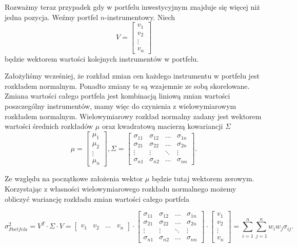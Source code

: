 \documentclass[12pt,titlepage]{article}
\numberwithin{equation}{section}
\begin{document}
Rozważmy teraz przypadek gdy w portfelu inwestycyjnym znajduje się więcej niż jedna pozycja. Weźmy portfel $n$-instrumentowy. Niech
$$V=\begin{bmatrix}
 v_1 \\ 
 v_2 \\
\vdots \\
v_n
\end{bmatrix}$$
będzie wektorem wartości kolejnych instrumentów w portfelu.

Założyliśmy wcześniej, że rozkład zmian cen każdego instrumentu w portfelu jest rozkładem normalnym. Ponadto zmiany te są wzajemnie ze sobą skorelowane. Zmiana wartości całego portfela jest kombinacją liniową zmian wartości poszczególny instrumentów, mamy więc do czynienia z wielowymiarowym rozkładem normalnym. Wielowymiarowy rozkład normalny zadany jest wektorem wartości średnich rozkładów $\mu$ oraz kwadratową macierzą kowariancji $\Sigma$
$$\mu=\begin{bmatrix}
 \mu_1 \\ 
 \mu_2 \\
\vdots \\
\mu_n
\end{bmatrix},\Sigma=\begin{bmatrix}
\sigma_{11} & \sigma_{12} & \hdots & \sigma_{1n} \\ 
\sigma_{21} & \sigma_{22} & \hdots & \sigma_{2n} \\
\vdots & \vdots & \ddots & \vdots\\
\sigma_{n1} & \sigma_{n2} & \hdots & \sigma_{nn}
\end{bmatrix}. $$

Ze względu na początkowe założenia wektor $\mu$ będzie tutaj wektorem zerowym. Korzystając z własności wielowymiarowego rozkładu normalnego możemy obliczyć wariancję rozkładu zmian wartości całego portfela 


$$ \sigma_{Portfela}^2 = V^T  \cdot \Sigma \cdot V =  \begin{bmatrix}
 v_1 & v_2 & \hdots & v_n
\end{bmatrix} 
\cdot
\begin{bmatrix}
\sigma_{11} & \sigma_{12} & \hdots & \sigma_{1n} \\ 
\sigma_{21} & \sigma_{22} & \hdots & \sigma_{2n} \\
\vdots & \vdots & \ddots & \vdots\\
\sigma_{n1} & \sigma_{n2} & \hdots & \sigma_{nn}
\end{bmatrix}  
\cdot
\begin{bmatrix}
 v_1 \\ 
 v_2 \\
\vdots \\
v_n
\end{bmatrix}
=\sum_{i=1}^{n}\sum_{j=1}^{n}w_i w_j \sigma_{ij}.
$$
\end{document}
